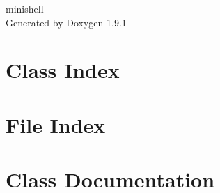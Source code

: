 \let\mypdfximage\pdfximage\def\pdfximage{\immediate\mypdfximage}\documentclass[twoside]{book}
\newcommand{\+}{\discretionary{\mbox{\scriptsize$\hookleftarrow$}}{}{}}
\newcommand{\clearemptydoublepage}{%
  \newpage{\pagestyle{empty}\cleardoublepage}%
}
\begin{document}
\raggedbottom

\hypersetup{pageanchor=false,
             bookmarksnumbered=true,
             pdfencoding=unicode
            }
\begin{titlepage}
\vspace*{7cm}
\begin{center}%
{\Large minishell }\\
\vspace*{1cm}
{\large Generated by Doxygen 1.9.1}\\
\end{center}
\end{titlepage}
\clearemptydoublepage
{}
\tableofcontents
\clearemptydoublepage
{}
\hypersetup{pageanchor=true}

\chapter{Class Index}

\chapter{File Index}

\chapter{Class Documentation}







\end{document}
